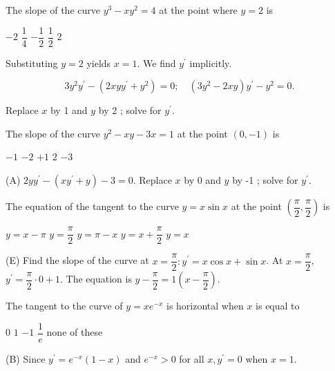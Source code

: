 \question
The slope of the curve $y^{3}-x y^{2}=4$ at the point where $y=2$ is
\begin{choices}
  \choice $-2$
  \choice $\dfrac{1}{4}$
  \choice $-\dfrac{1}{2}$
  \CorrectChoice $\dfrac{1}{2}$
  \choice $2$
\end{choices}
\begin{solution}
Substituting $y=2$ yields $x=1$. We find $y^{\prime}$ implicitly.


\[
3 y^{2} y^{\prime}-\left(2 x y y^{\prime}+y^{2}\right)=0 ; \quad\left(3 y^{2}-2 x y\right) y^{\prime}-y^{2}=0 .
\]

Replace $x$ by 1 and $y$ by 2 ; solve for $y^{\prime}$.
\end{solution}

\question
The slope of the curve $y^{2}-x y-3 x=1$ at the point $(0,-1)$ is
\begin{choices}
  \CorrectChoice $-1$
  \choice $-2$
  \choice $+1$
  \choice $2$
  \choice $-3$
\end{choices}
\begin{solution}
(A) $2 y y^{\prime}-\left(x y^{\prime}+y\right)-3=0$. Replace $x$ by 0 and $y$ by -1 ; solve for $y^{\prime}$.
\end{solution}

\question
The equation of the tangent to the curve $y=x \sin x$ at the point $\left(\dfrac{\pi}{2}, \dfrac{\pi}{2}\right)$ is
\begin{choices}
  \choice $y=x-\pi$
  \choice $y=\dfrac{\pi}{2}$
  \choice $y=\pi-x$
  \choice $y=x+\dfrac{\pi}{2}$
  \CorrectChoice $y=x$
\end{choices}
\begin{solution}
(E) Find the slope of the curve at $x=\dfrac{\pi}{2}: y^{\prime}=x \cos x+\sin x$. At $x=\dfrac{\pi}{2}$, $y^{\prime}=\dfrac{\pi}{2} \cdot 0+1$. The equation is $y-\dfrac{\pi}{2}=1\left(x-\dfrac{\pi}{2}\right)$.
\end{solution}


\newpage



\question
The tangent to the curve of $y=x e^{-x}$ is horizontal when $x$ is equal to
\begin{choices}
  \choice $0$
  \CorrectChoice $1$
  \choice $-1$
  \choice $\dfrac{1}{e}$
  \choice none of these
\end{choices}
\begin{solution}
(B) Since $y^{\prime}=e^{-x}(1-x)$ and $e^{-x}>0$ for all $x, y^{\prime}=0$ when $x=1$.
\end{solution}

